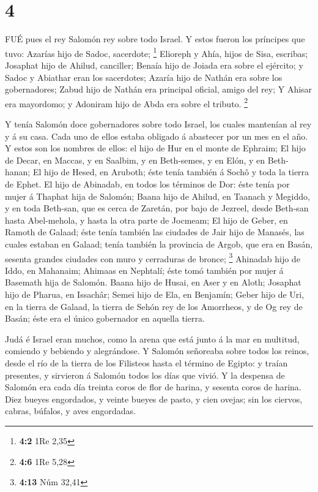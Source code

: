 \hypertarget{section-3}{%
\section{4}\label{section-3}}

 FUÉ pues el rey Salomón rey sobre todo Israel. 
Y estos fueron los príncipes que tuvo: Azarías hijo de Sadoc, sacerdote;
\footnote{\textbf{4:2} 1Re 2,35}  Elioreph y Ahía, hijos de
Sisa, escribas; Josaphat hijo de Ahilud, canciller;  Benaía
hijo de Joiada era sobre el ejército; y Sadoc y Abiathar eran los
sacerdotes;  Azaría hijo de Nathán era sobre los
gobernadores; Zabud hijo de Nathán era principal oficial, amigo del rey;
 Y Ahisar era mayordomo; y Adoniram hijo de Abda era sobre
el tributo. \footnote{\textbf{4:6} 1Re 5,28}

 Y tenía Salomón doce gobernadores sobre todo Israel, los
cuales mantenían al rey y á su casa. Cada uno de ellos estaba obligado á
abastecer por un mes en el año.  Y estos son los nombres de
ellos: el hijo de Hur en el monte de Ephraim;  El hijo de
Decar, en Maccas, y en Saalbim, y en Beth-semes, y en Elón, y en
Beth-hanan;  El hijo de Hesed, en Aruboth; éste tenía
también á Sochô y toda la tierra de Ephet.  El hijo de
Abinadab, en todos los términos de Dor: éste tenía por mujer á Thaphat
hija de Salomón;  Baana hijo de Ahilud, en Taanach y
Megiddo, y en toda Beth-san, que es cerca de Zaretán, por bajo de
Jezreel, desde Beth-san hasta Abel-mehola, y hasta la otra parte de
Jocmeam;  El hijo de Geber, en Ramoth de Galaad; éste tenía
también las ciudades de Jair hijo de Manasés, las cuales estaban en
Galaad; tenía también la provincia de Argob, que era en Basán, sesenta
grandes ciudades con muro y cerraduras de bronce; \footnote{\textbf{4:13}
  Núm 32,41}  Ahinadab hijo de Iddo, en Mahanaim;
 Ahimaas en Nephtalí; éste tomó también por mujer á
Basemath hija de Salomón.  Baana hijo de Husai, en Aser y
en Aloth;  Josaphat hijo de Pharua, en Issachâr;
 Semei hijo de Ela, en Benjamín;  Geber hijo
de Uri, en la tierra de Galaad, la tierra de Sehón rey de los Amorrheos,
y de Og rey de Basán; éste era el único gobernador en aquella tierra.

 Judá é Israel eran muchos, como la arena que está junto á
la mar en multitud, comiendo y bebiendo y alegrándose.  Y
Salomón señoreaba sobre todos los reinos, desde el río de la tierra de
los Filisteos hasta el término de Egipto: y traían presentes, y
sirvieron á Salomón todos los días que vivió.  Y la
despensa de Salomón era cada día treinta coros de flor de harina, y
sesenta coros de harina.  Diez bueyes engordados, y veinte
bueyes de pasto, y cien ovejas; sin los ciervos, cabras, búfalos, y aves
engordadas.

